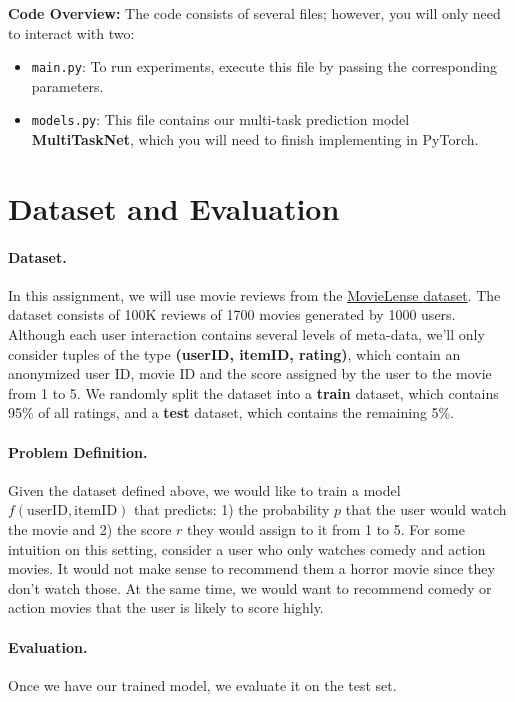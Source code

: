 \documentclass[12pt]{article}
\begin{document}
\vspace{0.2cm}

\noindent\textbf{Code Overview:} The code consists of several files; however, you will only need to interact with two:

\begin{itemize}
    \item \texttt{main.py}: To run experiments, execute this file by passing the corresponding parameters. 
    \item \texttt{models.py}: This file contains our multi-task prediction model \textbf{MultiTaskNet}, which you will need to finish implementing in PyTorch.
\end{itemize}


\section{Dataset and Evaluation}

\paragraph{Dataset.} In this assignment, we will use movie reviews from the \href{https://grouplens.org/datasets/movielens/100k}{MovieLense dataset}. The dataset consists of 100K reviews of 1700 movies generated by 1000 users. Although each user interaction contains several levels of meta-data, we'll only consider tuples of the type \textbf{(userID, itemID, rating)}, which contain an anonymized user ID, movie ID and the score assigned by the user to the movie from 1 to 5. We randomly split the dataset into a \textbf{train} dataset, which contains 95\% of all ratings, and a \textbf{test} dataset, which contains the remaining 5\%.

\paragraph{Problem Definition.}
Given the dataset defined above, we would like to train a model $f(\text{userID}, \text{itemID})$ that predicts: 1) the probability $p$ that the user would watch the movie and 2) the score $r$ they would assign to it from 1 to 5. For some intuition on this setting, consider a user who only watches comedy and action movies. It would not make sense to recommend them a horror movie since they don't watch those. At the same time, we would want to recommend comedy or action movies that the user is likely to score highly. 

\paragraph{Evaluation.}
Once we have our trained model, we evaluate it on the test set.
\end{document}
